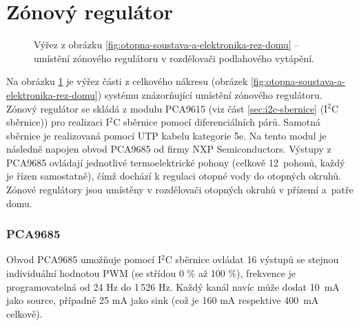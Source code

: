 \section{Zónový regulátor}
\begin{figure}[H]
   \centering
    \def\svgwidth{0.5\columnwidth}
   
    \caption[Umístění zónového regulátoru v rozdělovači podlahového vytápění.]{Výřez z obrázku \ref{fig:otopna-soustava-a-elektronika-rez-domu} – umístění zónového regulátoru v rozdělovači podlahového vytápění.}
    \label{fig:vyrez-zonovy-regulator}
\end{figure}
Na obrázku \ref{fig:vyrez-zonovy-regulator} je výřez části z celkového nákresu (obrázek \ref{fig:otopna-soustava-a-elektronika-rez-domu}) systému znázorňující umístění zónového regulátoru. Zónový regulátor se skládá z modulu PCA9615 (viz část  \ref{sec:i2c-sbernice} (I$^2$C sběrnice)) pro realizaci I$^2$C sběrnice pomocí diferenciálních párů. Samotná sběrnice je realizovaná pomocí UTP kabelu kategorie 5e. Na tento modul je následně napojen obvod PCA9685 \cite{pca9685} od firmy NXP Semiconductors. Výstupy z PCA9685 ovládají jednotlivé termoelektrické pohony (celkově 12~pohonů, každý je řízen samostatně), čímž dochází k regulaci otopné vody do otopných okruhů. Zónové regulátory jsou umístěny v rozdělovači otopných okruhů v přízemí a~patře domu.

\subsubsection{PCA9685}
Obvod PCA9685 umožňuje pomocí I$^2$C sběrnice ovládat 16 výstupů se stejnou individuální hodnotou PWM (se střídou 0 \% až 100 \%), frekvence je programovatelná od 24 Hz do 1\,526 Hz. Každý kanál navíc může dodat 10~mA jako source, případně 25 mA jako sink (což je 160 mA respektive 400~mA celkově).

